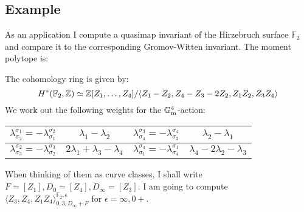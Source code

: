\subsection{Example} As an application I compute a quasimap invariant of the Hirzebruch surface $\mathbb F_2$ and compare it to the corresponding Gromov-Witten invariant. The moment polytope is:
\begin{center}
\end{center}
The cohomology ring is given by:
\[
 H^*(\mathbb F_2,\mathbb{Z})\simeq\mathbb{Z}[Z_1,\ldots,Z_4]/\langle Z_1-Z_2,Z_4-Z_3-2Z_2, Z_1Z_2,Z_3Z_4\rangle
\]
We work out the following weights for the $\mathbb{G}_{\text{m}}^4$-action:

\begin{center}
 \begin{tabular}{||c|c||c|c||}
  \hline
  $\lambda^{\sigma_1}_{\sigma_2}=-\lambda^{\sigma_2}_{\sigma_1}$ & $\lambda_1-\lambda_2$ & $\lambda^{\sigma_3}_{\sigma_4}=-\lambda^{\sigma_4}_{\sigma_3}$ & $\lambda_2-\lambda_1$ \\
  \hline
  $\lambda^{\sigma_2}_{\sigma_3}=-\lambda^{\sigma_3}_{\sigma_2}$ & $2\lambda_1+\lambda_3-\lambda_4$ & $\lambda^{\sigma_4}_{\sigma_1}=-\lambda^{\sigma_1}_{\sigma_4}$ & $\lambda_4-2\lambda_2-\lambda_3$ \\
  \hline
 \end{tabular}
\end{center}

When thinking of them as curve classes, I shall write $F=[Z_1], D_0=[Z_4], D_\infty=[Z_3]$. I am going to compute $\langle Z_3,Z_4,Z_1Z_4\rangle^{\mathbb F_2,\epsilon}_{0,3,D_\infty+F}$ for $\epsilon=\infty,0+$.

